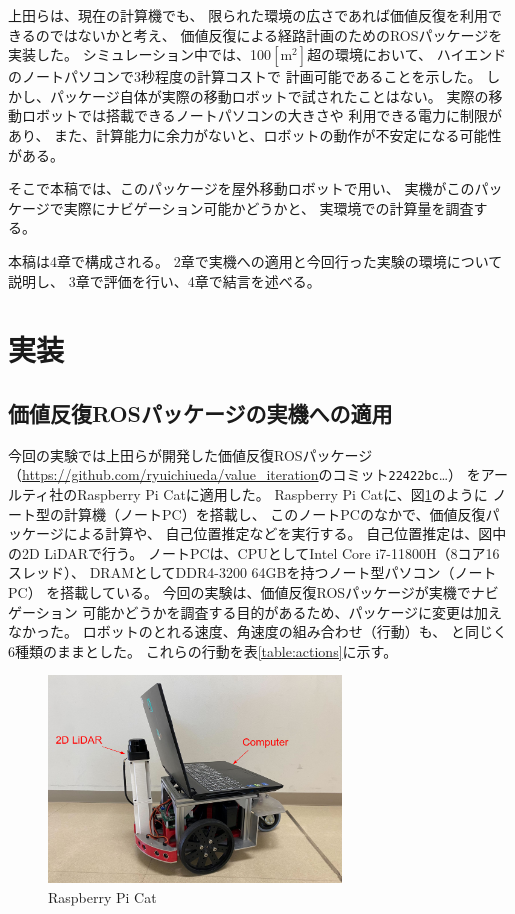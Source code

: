 \documentclass{jarticle}
\begin{document}
上田らは、現在の計算機でも、
限られた環境の広さであれば価値反復を利用できるのではないかと考え、
価値反復による経路計画のためのROSパッケージを実装した\cite{上田rsj2021}。
シミュレーション中では、100$\mathrm{[m^2]}$超の環境において、
ハイエンドのノートパソコンで3秒程度の計算コストで
計画可能であることを示した。
しかし、パッケージ自体が実際の移動ロボットで試されたことはない。
実際の移動ロボットでは搭載できるノートパソコンの大きさや
利用できる電力に制限があり、
また、計算能力に余力がないと、ロボットの動作が不安定になる可能性がある。

そこで本稿では、このパッケージを屋外移動ロボットで用い、
実機がこのパッケージで実際にナビゲーション可能かどうかと、
実環境での計算量を調査する。

本稿は4章で構成される。
2章で実機への適用と今回行った実験の環境について説明し、
3章で評価を行い、4章で結言を述べる。

\section{実装}%

\subsection{価値反復ROSパッケージの実機への適用}

今回の実験では上田らが開発した価値反復ROSパッケージ
（\url{https://github.com/ryuichiueda/value_iteration}のコミット\texttt{22422bc}\dots）
\cite{上田rsj2021}をアールティ社のRaspberry Pi Catに適用した。
Raspberry Pi Catに、図\ref{fig:raspicat}のように
ノート型の計算機（ノートPC）を搭載し、
このノートPCのなかで、価値反復パッケージによる計算や、
自己位置推定などを実行する。
自己位置推定は、図中の2D LiDARで行う。
ノートPCは、CPUとしてIntel Core i7-11800H（8コア16スレッド）、
DRAMとしてDDR4-3200 64GBを持つノート型パソコン（ノートPC）
を搭載している。
今回の実験は、価値反復ROSパッケージが実機でナビゲーション
可能かどうかを調査する目的があるため、パッケージに変更は加えなかった。
ロボットのとれる速度、角速度の組み合わせ（行動）も、
\cite{上田rsj2021}と同じく6種類のままとした。
これらの行動を表\ref{table:actions}に示す。

\begin{figure}[htb]
  \centering
   \includegraphics[height=55mm]{./figs/raspicat.png}
   \caption{Raspberry Pi Cat}
	\label{fig:raspicat}
\end{figure}
\end{document}

